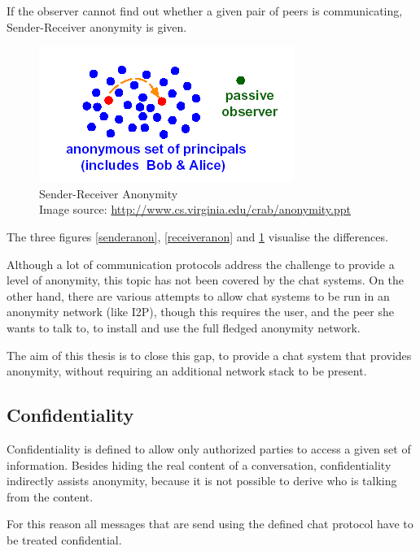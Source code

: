 If the observer cannot find out whether a given pair of peers
is communicating, Sender-Receiver anonymity is given.
\begin{figure}
    \centering
    \caption[Sender-Receiver Anonymity]{Sender-Receiver Anonymity\\Image source: \protect\url{http://www.cs.virginia.edu/crab/anonymity.ppt}}
    \label{senderreceiveranon}
    \includegraphics[scale=0.8]{sender-receiver-anon.png}
\end{figure}
The three figures \ref{senderanon}, \ref{receiveranon} and
\ref{senderreceiveranon} visualise the differences.

Although a lot of communication protocols address the challenge
to provide a level of anonymity, this topic has not been covered
by the chat systems. On the other hand, there are various attempts
to allow chat systems to be run in an anonymity network (like I2P), 
though this requires the user, and the peer she wants to talk to,
to install and use the full fledged anonymity network.

The aim of this thesis is to close this gap, to provide a chat system
that provides anonymity, without requiring an additional network stack
to be present.
\subsection{Confidentiality}
Confidentiality is defined to allow only authorized parties to access
a given set of information. Besides hiding the real content of a conversation,
confidentiality indirectly assists anonymity, because it is not possible to
derive who is talking from the content.

For this reason all messages that are send using the defined chat protocol
have to be treated confidential.
% 
